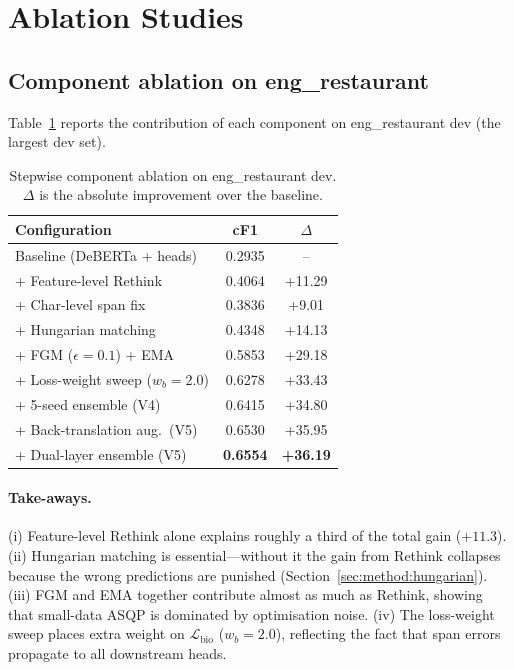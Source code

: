 \documentclass[runningheads]{llncs}
\begin{document}
\section{Ablation Studies}
\label{sec:ablation}

\subsection{Component ablation on eng\_restaurant}

Table~\ref{tab:abl-eng} reports the contribution of each component on
eng\_restaurant dev (the largest dev set).

\begin{table}[htbp]
\centering\small
\caption{Stepwise component ablation on eng\_restaurant dev.
$\Delta$ is the absolute improvement over the baseline.}
\label{tab:abl-eng}
\begin{tabular}{lcc}
\toprule
Configuration & cF1 & $\Delta$ \\
\midrule
Baseline (DeBERTa + heads) & 0.2935 & -- \\
+ Feature-level Rethink     & 0.4064 & +11.29 \\
+ Char-level span fix       & 0.3836 & +9.01 \\
+ Hungarian matching        & 0.4348 & +14.13 \\
+ FGM ($\epsilon{=}0.1$) + EMA & 0.5853 & +29.18 \\
+ Loss-weight sweep ($w_b{=}2.0$) & 0.6278 & +33.43 \\
+ 5-seed ensemble (V4)      & 0.6415 & +34.80 \\
+ Back-translation aug.\ (V5) & 0.6530 & +35.95 \\
+ Dual-layer ensemble (V5)  & \textbf{0.6554} & \textbf{+36.19} \\
\bottomrule
\end{tabular}
\end{table}

\paragraph{Take-aways.}
(i) Feature-level Rethink alone explains roughly a third of the total
gain ($+11.3$).
(ii) Hungarian matching is essential---without it the gain from
Rethink collapses because the wrong predictions are punished
(Section~\ref{sec:method:hungarian}).
(iii) FGM and EMA together contribute almost as much as Rethink,
showing that small-data ASQP is dominated by optimisation noise.
(iv) The loss-weight sweep places extra weight on
$\mathcal{L}_\text{bio}$ ($w_b{=}2.0$), reflecting the fact that span
errors propagate to all downstream heads.
\end{document}
